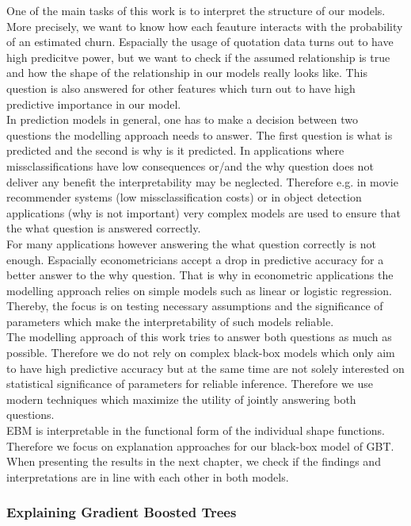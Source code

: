 \documentclass[12pt,titlepage]{article}
\begin{document}
One of the main tasks of this work is to interpret the structure of our models. More precisely, we want to know how each feauture interacts with the probability of an estimated churn. Espacially the usage of quotation data turns out to have high predicitve power, but we want to check if the assumed relationship is true and how the shape of the relationship in our models really looks like. This question is also answered for other features which turn out to have high predictive importance in our model. \\
In prediction models in general, one has to make a decision between two questions the modelling approach needs to answer. The first question is what is predicted and the second is why is it predicted. In applications where missclassifications have low consequences or/and the why question does not deliver any benefit the interpretability may be neglected. Therefore e.g. in movie recommender systems (low missclassification costs) or in object detection applications (why is not important) very complex models are used to ensure that the what question is answered correctly. \\
For many applications however answering the what question correctly is not enough. Espacially econometricians accept a drop in predictive accuracy for a better answer to the why question. That is why in econometric applications the modelling approach relies on simple models such as linear or logistic regression. Thereby, the focus is on testing necessary assumptions and the significance of parameters which make the interpretability of such models reliable. \\
The modelling approach of this work tries to answer both questions as much as possible. Therefore we do not rely on complex black-box models which only aim to have high predictive accuracy but at the same time are not solely interested on statistical significance of parameters for reliable inference. Therefore we use modern techniques which maximize the utility of jointly answering both questions. \\
EBM is interpretable in the functional form of the individual shape functions. Therefore we focus on explanation approaches for our black-box model of GBT. When presenting the results in the next chapter, we check if the findings and interpretations are in line with each other in both models. \\

\subsubsection*{Explaining Gradient Boosted Trees}
\end{document}
